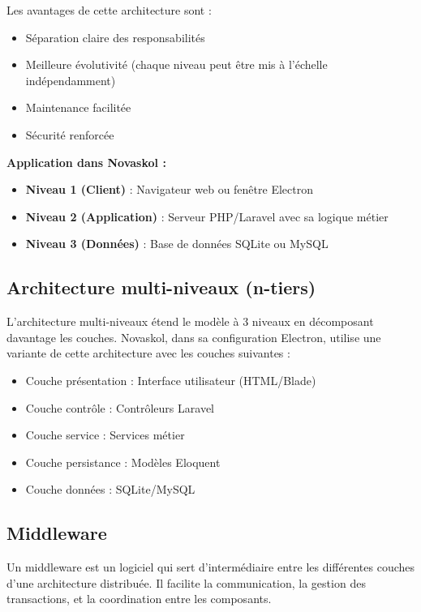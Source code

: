 \documentclass[12pt,a4paper,twoside]{report}
\begin{document}
Les avantages de cette architecture sont :
\begin{itemize}
    \item Séparation claire des responsabilités
    \item Meilleure évolutivité (chaque niveau peut être mis à l'échelle indépendamment)
    \item Maintenance facilitée
    \item Sécurité renforcée
\end{itemize}

\textbf{Application dans Novaskol :}
\begin{itemize}
    \item \textbf{Niveau 1 (Client)} : Navigateur web ou fenêtre Electron
    \item \textbf{Niveau 2 (Application)} : Serveur PHP/Laravel avec sa logique métier
    \item \textbf{Niveau 3 (Données)} : Base de données SQLite ou MySQL
\end{itemize}

\subsection{Architecture multi-niveaux (n-tiers)}

L'architecture multi-niveaux étend le modèle à 3 niveaux en décomposant davantage les couches. Novaskol, dans sa configuration Electron, utilise une variante de cette architecture avec les couches suivantes :
\begin{itemize}
    \item Couche présentation : Interface utilisateur (HTML/Blade)
    \item Couche contrôle : Contrôleurs Laravel
    \item Couche service : Services métier
    \item Couche persistance : Modèles Eloquent
    \item Couche données : SQLite/MySQL
\end{itemize}

\subsection{Middleware}

Un middleware est un logiciel qui sert d'intermédiaire entre les différentes couches d'une architecture distribuée. Il facilite la communication, la gestion des transactions, et la coordination entre les composants.
\end{document}
